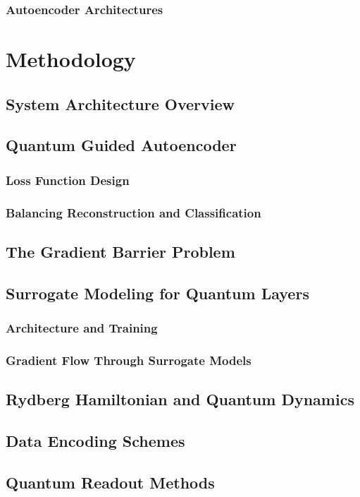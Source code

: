 \documentclass[conference]{IEEEtran}
\begin{document}
\subsubsection{Autoencoder Architectures}

\section{Methodology}
\subsection{System Architecture Overview}
\subsection{Quantum Guided Autoencoder}
\subsubsection{Loss Function Design}
\subsubsection{Balancing Reconstruction and Classification}
\subsection{The Gradient Barrier Problem}
\subsection{Surrogate Modeling for Quantum Layers}
\subsubsection{Architecture and Training}
\subsubsection{Gradient Flow Through Surrogate Models}
\subsection{Rydberg Hamiltonian and Quantum Dynamics}
\subsection{Data Encoding Schemes}
\subsection{Quantum Readout Methods}
\end{document}

